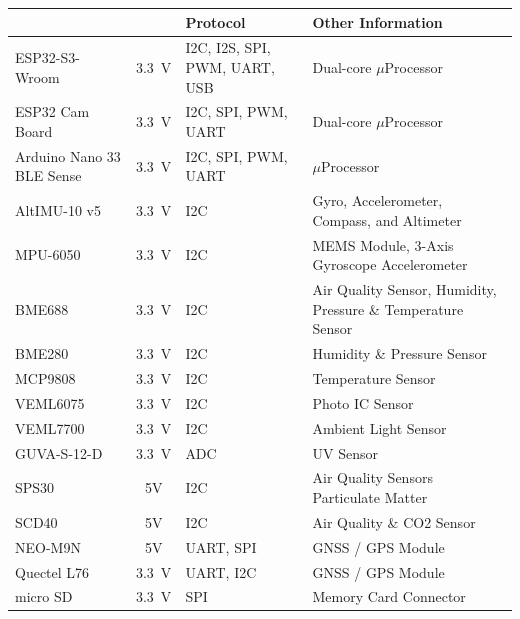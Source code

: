 \documentclass[11pt]{article}
\begin{document}
\begin{table}[htbp]
\centering
{}
\begin{tabularx}{0.95\textwidth}{>{\raggedright\arraybackslash}p{3.5cm}c>{\raggedright\arraybackslash}X>{\raggedright\arraybackslash}p{5.5cm}}
\hline
\rowcolor{DeepSkyBlue4}
\textbf{\color{white!50}{Component}} & \textbf{\color{white!50}{Voltage}} & \textbf{\color{white!50}\textbf{Protocol}} & \textbf{\color{white!50}\textbf{Other Information}} \\ \hline
\rowcolors{2}{red}{}
ESP32-S3-Wroom & \SI{3.3}{\volt} & I2C, I2S, SPI, PWM, UART, USB & {Dual-core $\mu$Processor}\\ %
\rowcolor{LightCyan1!50}ESP32 Cam Board & \SI{3.3}{\volt} & I2C, SPI, PWM, UART & {Dual-core $\mu$Processor}\\ %
Arduino Nano 33 BLE Sense & \SI{3.3}{\volt} & I2C, SPI, PWM, UART & {$\mu$Processor}\\ %
\rowcolor{LightCyan1!50}AltIMU-10 v5 & \SI{3.3}{\volt} & I2C & Gyro, Accelerometer, Compass, and Altimeter\\ %
MPU-6050 & \SI{3.3}{\volt} & I2C & MEMS Module, 3-Axis Gyroscope\/ Accelerometer\\ %
\rowcolor{LightCyan1!50}BME688 & \SI{3.3}{\volt} & I2C & Air Quality Sensor, Humidity, Pressure \& Temperature Sensor\\ %
BME280 & \SI{3.3}{\volt} & I2C & Humidity \& Pressure Sensor\\ %
\rowcolor{LightCyan1!50}MCP9808 & \SI{3.3}{\volt} & I2C & Temperature Sensor\\ %
VEML6075 & \SI{3.3}{\volt} & I2C & Photo IC Sensor\\ %
\rowcolor{LightCyan1!50}VEML7700 & \SI{3.3}{\volt} & I2C & Ambient Light Sensor\\ %
GUVA-S-12-D & \SI{3.3}{\volt} & ADC & UV Sensor\\ %
\rowcolor{LightCyan1!50}SPS30 & 5V & I2C & Air Quality Sensors Particulate Matter \\ %
SCD40 & 5V & I2C & Air Quality \& CO2 Sensor\\ %
\rowcolor{LightCyan1!50}NEO-M9N & 5V & UART, SPI & GNSS / GPS Module\\ %
Quectel L76 & \SI{3.3}{\volt} & UART, I2C & GNSS / GPS Module\\ %
\rowcolor{LightCyan1!50}micro SD & \SI{3.3}{\volt} & SPI & Memory Card Connector\\ %

\end{tabularx}
\end{table}
\end{document}
